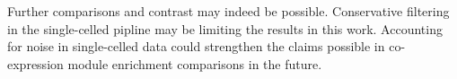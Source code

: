 \documentclass[10pt,letterpaper]{article}
\begin{document}
Further comparisons and contrast may indeed be possible. Conservative filtering in the single-celled pipline may be limiting the results in this work. Accounting for noise in single-celled data could strengthen the claims possible in co-expression module enrichment comparisons in the future. 

\nolinenumbers


%
%
% 




\end{document}
